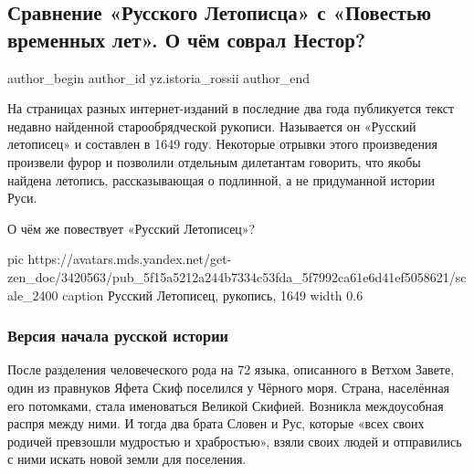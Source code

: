  
 
 
 
 
 
\subsection{Сравнение «Русского Летописца» с «Повестью временных лет». О чём соврал Нестор?}
\label{sec:04_10_2020.sites.ru.zen_yandex.yz.istoria_rossii.1.russkii_letopisec_nestor_sravnenie}
\ifcmt
	author_begin
   author_id yz.istoria_rossii
	author_end
\fi


На страницах разных интернет-изданий в последние два года публикуется текст
недавно найденной старообрядческой рукописи. Называется он «Русский летописец»
и составлен в 1649 году. Некоторые отрывки этого произведения произвели фурор и
позволили отдельным дилетантам говорить, что якобы найдена летопись,
рассказывающая о подлинной, а не придуманной истории Руси.

О чём же повествует «Русский Летописец»?


\ifcmt
  pic https://avatars.mds.yandex.net/get-zen_doc/3420563/pub_5f15a5212a244b7334c53fda_5f7992ca61e6d41ef5058621/scale_2400
	caption Русский Летописец, рукопись, 1649
	width 0.6
\fi

\subsubsection{Версия начала русской истории}

После разделения человеческого рода на 72 языка, описанного в Ветхом Завете,
один из правнуков Яфета Скиф поселился у Чёрного моря. Страна, населённая его
потомками, стала именоваться Великой Скифией. Возникла междоусобная распря
между ними. И тогда два брата Словен и Рус, которые «всех своих родичей
превзошли мудростью и храбростью», взяли своих людей и отправились с ними
искать новой земли для поселения.

